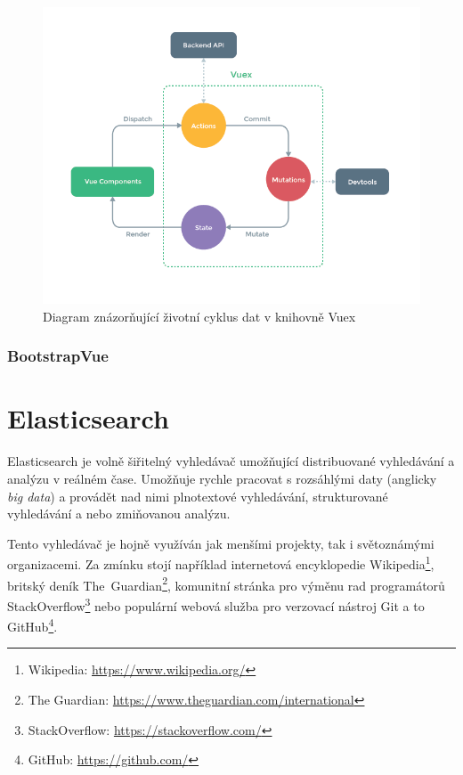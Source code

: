 \begin{figure}[H]
	\centering
	\includegraphics[width=\textwidth]{images/vuex.png}
	\caption{Diagram znázorňující životní cyklus dat v knihovně Vuex}
	\label{vuex-dataflow}
\end{figure}

\blindtext

\subsubsection*{BootstrapVue}

\section{Elasticsearch}
Elasticsearch je volně šiřitelný vyhledávač umožňující distribuované vyhledávání a analýzu v reálném čase. Umožňuje rychle pracovat s rozsáhlými daty (anglicky \emph{big data}) a provádět nad nimi plnotextové vyhledávání, strukturované vyhledávání a nebo zmiňovanou analýzu.

Tento vyhledávač je hojně využíván jak menšími projekty, tak i světoznámými organizacemi. Za zmínku stojí například internetová encyklopedie Wikipedia\footnote{Wikipedia: \url{https://www.wikipedia.org/}}, britský deník The~Guardian\footnote{The Guardian: \url{https://www.theguardian.com/international}}, komunitní stránka pro výměnu rad programátorů StackOverflow\footnote{StackOverflow: \url{https://stackoverflow.com/}} nebo populární webová služba pro verzovací nástroj Git a to GitHub\footnote{GitHub: \url{https://github.com/}}.

